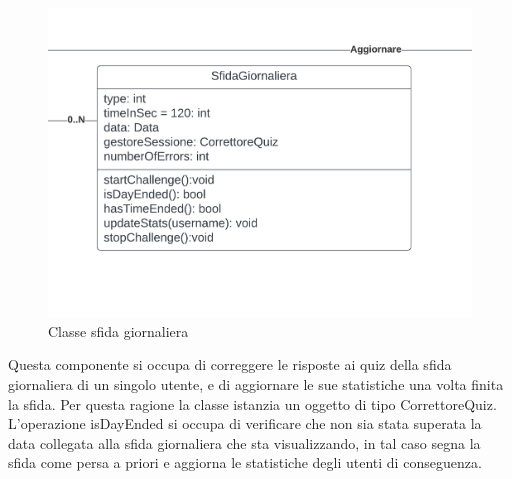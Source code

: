 \begin{figure}[!h]
\centering
\includegraphics[scale=0.10]{images/classe_sfida_giornaliera.png}
\caption{Classe sfida giornaliera}
\label{fig:classe_sfida_giornaliera}
\end{figure}
\noindent
Questa componente si occupa di correggere le risposte ai quiz della sfida giornaliera di un singolo utente, e di aggiornare le sue statistiche una volta finita la sfida. Per questa ragione la classe istanzia un oggetto di tipo CorrettoreQuiz. L'operazione isDayEnded si occupa di verificare che non sia stata superata la data collegata alla sfida giornaliera che sta visualizzando, in tal caso segna la sfida come persa a priori e aggiorna le statistiche degli utenti di conseguenza. 

